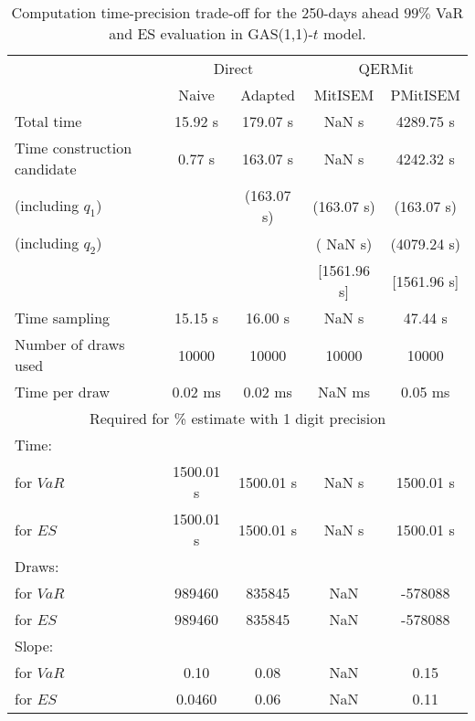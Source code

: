 { \renewcommand{\arraystretch}{1.3} 
\begin{table}[h] 
\centering 
\caption{Computation time-precision trade-off for the 250-days ahead  $99\%$ VaR and ES evaluation in GAS(1,1)-$t$ model.} 
\label{tab:time_precision_t_gas} 
\begin{tabular}{lcccc}  
  & \multicolumn{2}{c}{Direct} & \multicolumn{2}{c}{QERMit}  \\ \cline{2-5} 
  & Naive & Adapted & MitISEM & PMitISEM  \\ \hline 
Total time & 15.92 s & 179.07 s &  NaN s & 4289.75 s \\ 
Time construction candidate & 0.77 s & 163.07 s &  NaN s & 4242.32 s \\ 
 (including $q_{1}$) &   &  (163.07 s) & (163.07 s) & (163.07 s) \\ 
 (including $q_{2}$) &   &  & ( NaN s) & (4079.24 s) \\ 
[Initialisation for $q_{2}$]&   &   & [1561.96 s] & [1561.96 s] \\ 
Time sampling & 15.15 s & 16.00 s &  NaN s & 47.44 s  \\  
Number of draws used & 10000 & 10000 & 10000 & 10000 \\ 
Time per draw & 0.02 ms & 0.02 ms &  NaN ms & 0.05 ms \\ \hline 
\multicolumn{5}{c}{Required for \% estimate with 1 digit precision} \\ \hline 
Time: &  &  &   &  \\ 
\hspace{1cm} for $VaR$ & 1500.01 s & 1500.01 s &  NaN s & 1500.01 s \\ 
\hspace{1cm} for $ES$ & 1500.01 s & 1500.01 s &  NaN s & 1500.01 s \\ 
Draws: &  &  &   &  \\ 
\hspace{1cm} for $VaR$ & 989460 & 835845  &    NaN  & -578088  \\ 
\hspace{1cm} for $ES$ & 989460 & 835845  &    NaN   & -578088  \\ 
\hline 
Slope: &  &  &   &  \\ 
\hspace{1cm} for $VaR$ & 0.10 & 0.08  &  NaN  & 0.15  \\ 
\hspace{1cm} for $ES$ & 0.0460 & 0.06  &  NaN   & 0.11  \\  \hline 
\end{tabular} 
\end{table} 
} 
